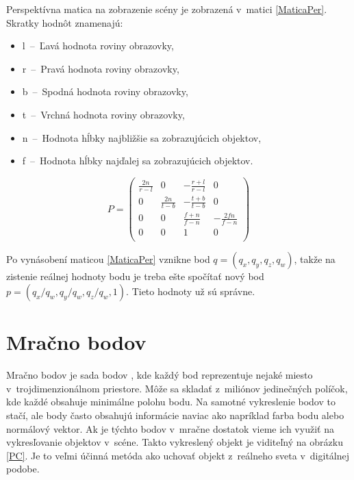 \noindent Perspektívna matica \cite{RTRend} na zobrazenie scény je zobrazená v~matici \ref{MaticaPer}. Skratky hodnôt znamenajú:

\begin{itemize}
    \item l  \,--\, Ľavá hodnota roviny obrazovky,
    \item r  \,--\, Pravá hodnota roviny obrazovky,
    \item b  \,--\, Spodná hodnota roviny obrazovky,
    \item t  \,--\, Vrchná hodnota roviny obrazovky,
    \item n  \,--\, Hodnota hĺbky najbližšie sa zobrazujúcich objektov,
    \item f  \,--\, Hodnota hĺbky najďalej sa zobrazujúcich objektov.
\end{itemize}

\begin{equation} \label{MaticaPer}
    P = 
    \begin{pmatrix}
    \frac{2n}{r - l} & 0 & -\frac{r + l}{r - l} & 0\\
    0 & \frac{2n}{t - b} & -\frac{t + b}{t - b} & 0\\
    0 & 0 & \frac{f + n}{f - n} & -\frac{2fn}{f - n}\\
    0 & 0 & 1 & 0\\
    \end{pmatrix}
\end{equation}

Po vynásobení maticou \ref{MaticaPer} \cite{RTRend} vznikne bod $q = (q_x, q_y, q_z, q_w)$, takže na zistenie reálnej hodnoty bodu je treba ešte spočítať nový bod $p = (q_x/q_w, q_y/q_w, q_z/q_w, 1)$. Tieto hodnoty už sú správne.

\section{Mračno bodov}
\label{MracnoBodov}
Mračno bodov je sada bodov \cite{pointClouds}, kde každý bod reprezentuje nejaké miesto v~trojdimenzionálnom priestore. Môže sa skladať z~miliónov jedinečných políčok, kde každé obsahuje minimálne polohu bodu. Na samotné vykreslenie bodov to stačí, ale body často obsahujú informácie naviac ako napríklad farba bodu alebo normálový vektor. Ak je týchto bodov v~mračne dostatok vieme ich využiť na vykresľovanie objektov v~scéne. Takto vykreslený objekt je viditeľný na obrázku \ref{PC}. Je to veľmi účinná metóda ako uchovať objekt z~reálneho sveta v~digitálnej podobe.

